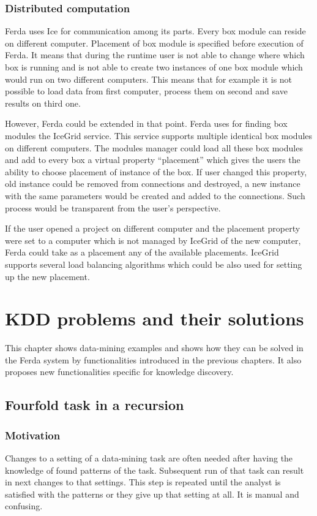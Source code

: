 \documentclass[a4paper,12pt]{book}
\begin{document}
\subsection{Distributed computation}
Ferda uses Ice for communication among its parts. Every box module can reside on different computer. Placement of box module is specified before execution of Ferda. It means that during the runtime user is not able to change where which box is running and is not able to create two instances of one box module which would run on two different computers. This means that for example it is not possible to load data from first computer, process them on second and save results on third one. 

However, Ferda could be extended in that point. Ferda uses for finding box modules the IceGrid service. This service supports multiple identical box modules on different computers. The modules manager could load all these box modules and add to every box a virtual property ``placement'' which gives the users the ability to choose placement of instance of the box. If user changed this property, old instance could be removed from connections and destroyed, a new instance with the same parameters would be created and added to the connections. Such process would be transparent from the user's perspective.

If the user opened a project on different computer and the placement property were set to a computer which is not managed by IceGrid of the new computer, Ferda could take as a placement any of the available placements. IceGrid supports several load balancing algorithms which could be also used for setting up the new placement.

\chapter{KDD problems and their solutions}
\label{chap:KDDExamples}
This chapter shows data-mining examples and shows how they can be solved in the Ferda system by functionalities introduced in the previous chapters. It also proposes new functionalities specific for knowledge discovery.

\section{Fourfold task in a recursion}
\subsection{Motivation}
Changes to a setting of a data-mining task are often needed after having the knowledge of found patterns of the task. Subsequent run of that task can result in next changes to that settings. This step is repeated until the analyst is satisfied with the patterns or they give up that setting at all. It is manual and confusing.
\end{document}
